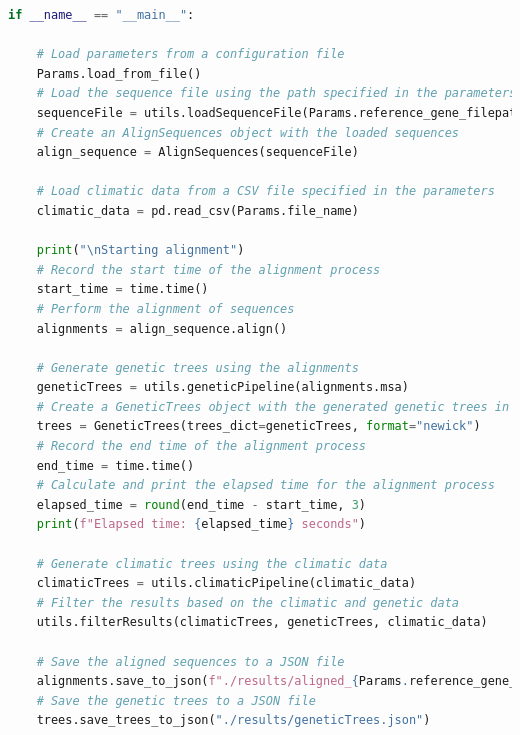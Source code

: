 \begin{lstlisting}[label=lst:main,language=Python,caption=Main script for tutorial using the aPhyloGeo package.]
if __name__ == "__main__":

    # Load parameters from a configuration file
    Params.load_from_file()
    # Load the sequence file using the path specified in the parameters
    sequenceFile = utils.loadSequenceFile(Params.reference_gene_filepath)
    # Create an AlignSequences object with the loaded sequences
    align_sequence = AlignSequences(sequenceFile)

    # Load climatic data from a CSV file specified in the parameters
    climatic_data = pd.read_csv(Params.file_name)

    print("\nStarting alignment")
    # Record the start time of the alignment process
    start_time = time.time()
    # Perform the alignment of sequences
    alignments = align_sequence.align()

    # Generate genetic trees using the alignments
    geneticTrees = utils.geneticPipeline(alignments.msa)
    # Create a GeneticTrees object with the generated genetic trees in Newick format
    trees = GeneticTrees(trees_dict=geneticTrees, format="newick")
    # Record the end time of the alignment process
    end_time = time.time()
    # Calculate and print the elapsed time for the alignment process
    elapsed_time = round(end_time - start_time, 3)
    print(f"Elapsed time: {elapsed_time} seconds")

    # Generate climatic trees using the climatic data
    climaticTrees = utils.climaticPipeline(climatic_data)
    # Filter the results based on the climatic and genetic data
    utils.filterResults(climaticTrees, geneticTrees, climatic_data)

    # Save the aligned sequences to a JSON file
    alignments.save_to_json(f"./results/aligned_{Params.reference_gene_file}.json")
    # Save the genetic trees to a JSON file
    trees.save_trees_to_json("./results/geneticTrees.json")
\end{lstlisting}


